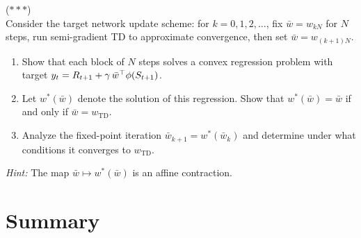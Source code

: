 \documentclass[11pt,a4paper]{article}
\begin{document}
\begin{exercise}
\textnormal{(\(***\))} \\
Consider the target network update scheme: for $k = 0, 1, 2, \ldots$,
fix $\bar{w} = w_{kN}$ for $N$ steps, run semi-gradient TD to
approximate convergence, then set $\bar{w} = w_{(k+1)N}$.
\begin{enumerate}[nosep]
  \item[(a)] Show that each block of $N$ steps solves a convex
    regression problem with target
    $y_t = R_{t+1} + \gamma\,\bar{w}^\top\phi(S_{t+1})$.
  \item[(b)] Let $w^*(\bar{w})$ denote the solution of this
    regression. Show that $w^*(\bar{w}) = \bar{w}$ if and only if
    $\bar{w} = w_{\mathrm{TD}}$.
  \item[(c)] Analyze the fixed-point iteration
    $\bar{w}_{k+1} = w^*(\bar{w}_k)$ and determine under what
    conditions it converges to $w_{\mathrm{TD}}$.
\end{enumerate}
\textit{Hint:} The map $\bar{w} \mapsto w^*(\bar{w})$ is an affine
contraction.
\end{exercise}

\section{Summary}
\label{sec:summary}
\end{document}
